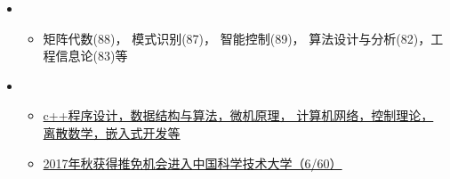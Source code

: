   \begin{itemize}[leftmargin=*]
    \item
      {\small
      \begin{itemize}
        \item{矩阵代数(88)， 模式识别(87)， 智能控制(89)， 算法设计与分析(82)，工程信息论(83)等}
      \end{itemize}
      }
    \item
      {\small
      \begin{itemize}
        \item \href{https://upload-images.jianshu.io/upload_images/15436989-0ee2629b0fdf4c1a.JPG?imageMogr2/auto-orient/strip%7CimageView2/2/w/1240}{c++程序设计，数据结构与算法，微机原理， 计算机网络，控制理论， 离散数学，嵌入式开发等}
        \\  
        \item \href{https://upload-images.jianshu.io/upload_images/15436989-502a4a23aea59e70.JPG?imageMogr2/auto-orient/strip%7CimageView2/2/w/1240}{2017年秋获得推免机会进入中国科学技术大学（6/60）}
      \end{itemize}
      }
  \end{itemize}